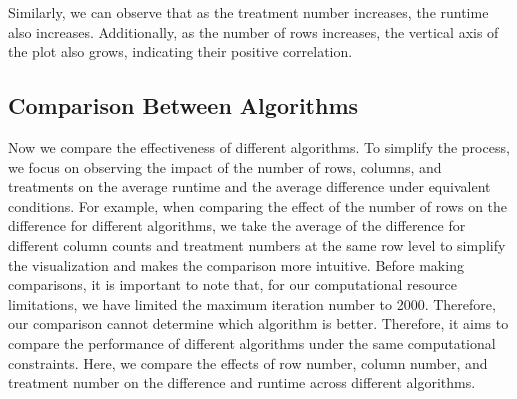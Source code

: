 \documentclass[
  a4paper,
  oneside,
  openany,
  12pt,
  onecolumn]{book}
\theoremstyle{plain}
\theoremstyle{definition}
\theoremstyle{remark}
\begin{document}
\begin{figure}


\caption{\label{fig-align}}

\end{figure}%

Similarly, we can observe that as the treatment number increases, the
runtime also increases. Additionally, as the number of rows increases,
the vertical axis of the plot also grows, indicating their positive
correlation.

\subsection{Comparison Between
Algorithms}\label{comparison-between-algorithms}

Now we compare the effectiveness of different algorithms. To simplify
the process, we focus on observing the impact of the number of rows,
columns, and treatments on the average runtime and the average
difference under equivalent conditions. For example, when comparing the
effect of the number of rows on the difference for different algorithms,
we take the average of the difference for different column counts and
treatment numbers at the same row level to simplify the visualization
and makes the comparison more intuitive. Before making comparisons, it
is important to note that, for our computational resource limitations,
we have limited the maximum iteration number to 2000. Therefore, our
comparison cannot determine which algorithm is better. Therefore, it
aims to compare the performance of different algorithms under the same
computational constraints. Here, we compare the effects of row number,
column number, and treatment number on the difference and runtime across
different algorithms.
\end{document}
